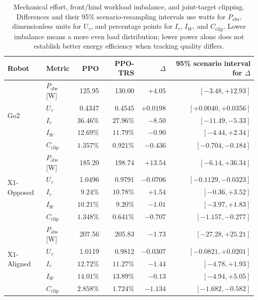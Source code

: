 \begin{table}[t]
    \centering
    \small
    \setlength{\tabcolsep}{6pt}
    \renewcommand{\arraystretch}{1.15}
    \caption{Mechanical effort, front/hind workload imbalance, and joint-target clipping. Differences and their 95\% scenario-resampling intervals use watts for $P_{\mathrm{abs}}$, dimensionless units for $U_\tau$, and percentage points for $I_\tau$, $I_W$, and $C_{\mathrm{clip}}$. Lower imbalance means a more even load distribution; lower power alone does not establish better energy efficiency when tracking quality differs.}
    \label{tab:loco_effort_statistics}
    \begin{tabular}{@{}llrrrr@{}}
        \toprule
        Robot & Metric & PPO & PPO-TRS & $\Delta$ & \shortstack{95\% scenario\\interval for $\Delta$} \\
        \midrule
        \multirow{5}{*}{Go2}
        & $P_{\mathrm{abs}}$ [W] & 125.95 & 130.00 & $+4.05$ & $[-3.48,+12.93]$ \\
        & $U_\tau$ & 0.4347 & 0.4545 & $+0.0198$ & $[+0.0040,+0.0356]$ \\
        & $I_\tau$ & $36.46\%$ & $27.96\%$ & $-8.50$ & $[-11.49,-5.33]$ \\
        & $I_W$ & $12.69\%$ & $11.79\%$ & $-0.90$ & $[-4.44,+2.34]$ \\
        & $C_{\mathrm{clip}}$ & $1.357\%$ & $0.921\%$ & $-0.436$ & $[-0.704,-0.184]$ \\
        \midrule
        \multirow{5}{*}{X1-Opposed}
        & $P_{\mathrm{abs}}$ [W] & 185.20 & 198.74 & $+13.54$ & $[-6.14,+36.34]$ \\
        & $U_\tau$ & 1.0496 & 0.9791 & $-0.0706$ & $[-0.1129,-0.0323]$ \\
        & $I_\tau$ & $9.24\%$ & $10.78\%$ & $+1.54$ & $[-0.36,+3.52]$ \\
        & $I_W$ & $10.21\%$ & $9.20\%$ & $-1.01$ & $[-3.97,+1.83]$ \\
        & $C_{\mathrm{clip}}$ & $1.348\%$ & $0.641\%$ & $-0.707$ & $[-1.157,-0.277]$ \\
        \midrule
        \multirow{5}{*}{X1-Aligned}
        & $P_{\mathrm{abs}}$ [W] & 207.56 & 205.83 & $-1.73$ & $[-27.28,+25.21]$ \\
        & $U_\tau$ & 1.0119 & 0.9812 & $-0.0307$ & $[-0.0821,+0.0201]$ \\
        & $I_\tau$ & $12.72\%$ & $11.27\%$ & $-1.44$ & $[-4.78,+1.93]$ \\
        & $I_W$ & $14.01\%$ & $13.89\%$ & $-0.13$ & $[-4.94,+5.05]$ \\
        & $C_{\mathrm{clip}}$ & $2.858\%$ & $1.724\%$ & $-1.134$ & $[-1.682,-0.582]$ \\
        \bottomrule
    \end{tabular}
\end{table}

